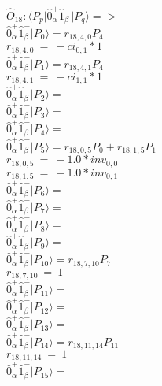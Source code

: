 \documentclass[14pt]{article}
\begin{document}
    $\hat{O}_{18}:  \langle{P_p}\vert \hat{0}_{\alpha}^{+}\hat{1}_{\beta}^{-} \vert{P_q}\rangle => $ \\ 
    $ \hat{0}_{\alpha}^{+}\hat{1}_{\beta}^{-} \vert{P_{0}}\rangle = {r}_{18,4,0}P_{4} $ \\ 
    ${r}_{18,4,0}\ =\ -{ci}_{0,1}*1 $ \\ 
    $ \hat{0}_{\alpha}^{+}\hat{1}_{\beta}^{-} \vert{P_{1}}\rangle = {r}_{18,4,1}P_{4} $ \\ 
    ${r}_{18,4,1}\ =\ -{ci}_{1,1}*1 $ \\ 
    $ \hat{0}_{\alpha}^{+}\hat{1}_{\beta}^{-} \vert{P_{2}}\rangle =  $ \\ 
    $ \hat{0}_{\alpha}^{+}\hat{1}_{\beta}^{-} \vert{P_{3}}\rangle =  $ \\ 
    $ \hat{0}_{\alpha}^{+}\hat{1}_{\beta}^{-} \vert{P_{4}}\rangle =  $ \\ 
    $ \hat{0}_{\alpha}^{+}\hat{1}_{\beta}^{-} \vert{P_{5}}\rangle = {r}_{18,0,5}P_{0}+{r}_{18,1,5}P_{1} $ \\ 
    ${r}_{18,0,5}\ =\ -1.0*{inv}_{0,0} $ \\ 
    ${r}_{18,1,5}\ =\ -1.0*{inv}_{0,1} $ \\ 
    $ \hat{0}_{\alpha}^{+}\hat{1}_{\beta}^{-} \vert{P_{6}}\rangle =  $ \\ 
    $ \hat{0}_{\alpha}^{+}\hat{1}_{\beta}^{-} \vert{P_{7}}\rangle =  $ \\ 
    $ \hat{0}_{\alpha}^{+}\hat{1}_{\beta}^{-} \vert{P_{8}}\rangle =  $ \\ 
    $ \hat{0}_{\alpha}^{+}\hat{1}_{\beta}^{-} \vert{P_{9}}\rangle =  $ \\ 
    $ \hat{0}_{\alpha}^{+}\hat{1}_{\beta}^{-} \vert{P_{10}}\rangle = {r}_{18,7,10}P_{7} $ \\ 
    ${r}_{18,7,10}\ =\ 1 $ \\ 
    $ \hat{0}_{\alpha}^{+}\hat{1}_{\beta}^{-} \vert{P_{11}}\rangle =  $ \\ 
    $ \hat{0}_{\alpha}^{+}\hat{1}_{\beta}^{-} \vert{P_{12}}\rangle =  $ \\ 
    $ \hat{0}_{\alpha}^{+}\hat{1}_{\beta}^{-} \vert{P_{13}}\rangle =  $ \\ 
    $ \hat{0}_{\alpha}^{+}\hat{1}_{\beta}^{-} \vert{P_{14}}\rangle = {r}_{18,11,14}P_{11} $ \\ 
    ${r}_{18,11,14}\ =\ 1 $ \\ 
    $ \hat{0}_{\alpha}^{+}\hat{1}_{\beta}^{-} \vert{P_{15}}\rangle =  $ \\ 
    
\end{document}
